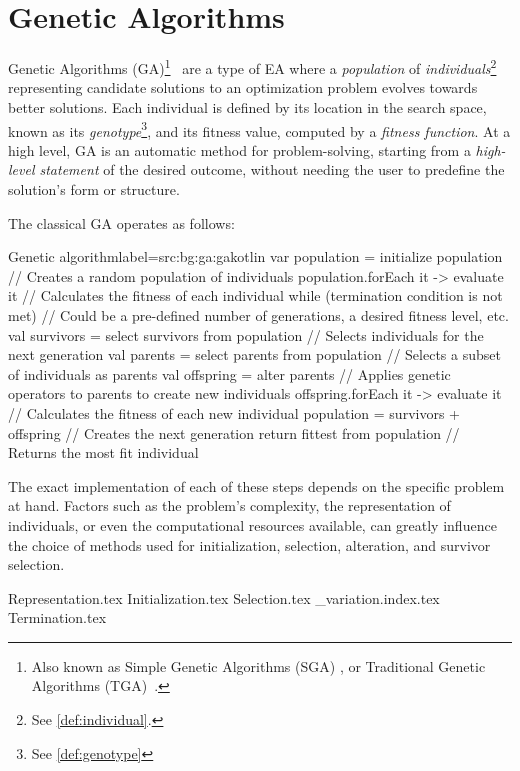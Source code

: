 \section{Genetic Algorithms}
\label{sec:bg:ga}
  Genetic Algorithms (GA)\footnote{
    Also known as Simple Genetic Algorithms (SGA) 
    \autocite{yuIntroductionEvolutionaryAlgorithms2010}, or Traditional 
    Genetic Algorithms (TGA)~\autocite{shiffmanNatureCode2012}.
  }~\autocite{hollandAdaptationNaturalArtificial1992a,kozaGeneticProgrammingProgramming1992a,yuIntroductionEvolutionaryAlgorithms2010,shiffmanNatureCode2012}
  are a type of EA where a \emph{population} of \emph{individuals}\footnote{
    See \vref{def:individual}.
  } representing candidate solutions to an optimization problem evolves towards 
  better solutions.
  Each individual is defined by its location in the search space, known as its
  \emph{genotype}\footnote{See \vref{def:genotype}}, and its fitness value, 
  computed by a \emph{fitness function}.
  At a high level, GA is an automatic method for problem-solving, starting from
  a \textit{high-level statement} of the desired outcome, without needing the
  user to predefine the solution's form or structure.

  The classical GA operates as follows:

  \begin{code}{Genetic algorithm}{label={src:bg:ga:ga}}{kotlin}
    var population = initialize population  // Creates a random population of individuals
    population.forEach { it -> evaluate it }  // Calculates the fitness of each individual
    while (termination condition is not met) {  // Could be a pre-defined number of generations, a desired fitness level, etc.
        val survivors = select survivors from population // Selects individuals for the next generation
        val parents = select parents from population // Selects a subset of individuals as parents
        val offspring = alter parents // Applies genetic operators to parents to create new individuals
        offspring.forEach { it -> evaluate it } // Calculates the fitness of each new individual
        population = survivors + offspring // Creates the next generation
    }
    return fittest from population  // Returns the most fit individual
  \end{code}

  The exact implementation of each of these steps depends on the specific 
  problem at hand.
  Factors such as the problem's complexity, the representation of individuals,
  or even the computational resources available, can greatly influence the
  choice of methods used for initialization, selection, alteration, and survivor
  selection.

  {Representation.tex}
  {Initialization.tex}
  {Selection.tex}
  {_variation.index.tex}
  {Termination.tex}
